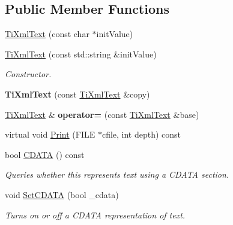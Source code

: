 \subsection*{Public Member Functions}
\begin{DoxyCompactItemize}
\item 
\hyperlink{class_ti_xml_text_af659e77c6b87d684827f35a8f4895960}{Ti\+Xml\+Text} (const char $\ast$init\+Value)
\item 
\hypertarget{class_ti_xml_text_a439792f6183a3d3fb6f2bc2b16fa5691}{}\label{class_ti_xml_text_a439792f6183a3d3fb6f2bc2b16fa5691} 
\hyperlink{class_ti_xml_text_a439792f6183a3d3fb6f2bc2b16fa5691}{Ti\+Xml\+Text} (const std\+::string \&init\+Value)
\begin{DoxyCompactList}\small\item\em Constructor. \end{DoxyCompactList}\item 
\hypertarget{class_ti_xml_text_a8d2cc1b4af2208cbb0171cf20f6815d1}{}\label{class_ti_xml_text_a8d2cc1b4af2208cbb0171cf20f6815d1} 
{\bfseries Ti\+Xml\+Text} (const \hyperlink{class_ti_xml_text}{Ti\+Xml\+Text} \&copy)
\item 
\hypertarget{class_ti_xml_text_aed5b13f9c1b804c616fd533882c29f57}{}\label{class_ti_xml_text_aed5b13f9c1b804c616fd533882c29f57} 
\hyperlink{class_ti_xml_text}{Ti\+Xml\+Text} \& {\bfseries operator=} (const \hyperlink{class_ti_xml_text}{Ti\+Xml\+Text} \&base)
\item 
virtual void \hyperlink{class_ti_xml_text_a75f6895906333894e2574cc8cf77ea79}{Print} (F\+I\+LE $\ast$cfile, int depth) const
\item 
\hypertarget{class_ti_xml_text_aac1f4764d220ed6bf809b16dfcb6b45a}{}\label{class_ti_xml_text_aac1f4764d220ed6bf809b16dfcb6b45a} 
bool \hyperlink{class_ti_xml_text_aac1f4764d220ed6bf809b16dfcb6b45a}{C\+D\+A\+TA} () const
\begin{DoxyCompactList}\small\item\em Queries whether this represents text using a C\+D\+A\+TA section. \end{DoxyCompactList}\item 
\hypertarget{class_ti_xml_text_acb17ff7c5d09b2c839393445a3de5ea9}{}\label{class_ti_xml_text_acb17ff7c5d09b2c839393445a3de5ea9} 
void \hyperlink{class_ti_xml_text_acb17ff7c5d09b2c839393445a3de5ea9}{Set\+C\+D\+A\+TA} (bool \+\_\+cdata)
\begin{DoxyCompactList}\small\item\em Turns on or off a C\+D\+A\+TA representation of text. \end{DoxyCompactList}\item 

\end{DoxyCompactItemize}
